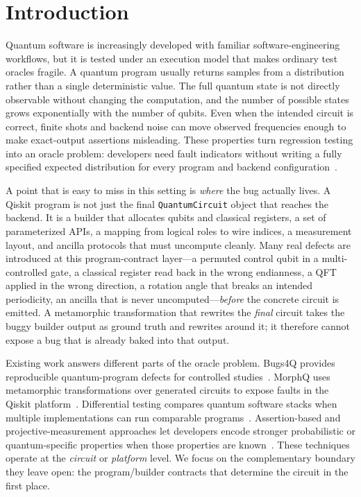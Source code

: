 \section{Introduction}

Quantum software is increasingly developed with familiar software-engineering workflows, but it is tested under an execution model that makes ordinary test oracles fragile. A quantum program usually returns samples from a distribution rather than a single deterministic value. The full quantum state is not directly observable without changing the computation, and the number of possible states grows exponentially with the number of qubits. Even when the intended circuit is correct, finite shots and backend noise can move observed frequencies enough to make exact-output assertions misleading. These properties turn regression testing into an oracle problem: developers need fault indicators without writing a fully specified expected distribution for every program and backend configuration~\cite{preskill2018quantum,huang2019statistical,li2020projection}.

A point that is easy to miss in this setting is \emph{where} the bug actually lives. A Qiskit program is not just the final \texttt{QuantumCircuit} object that reaches the backend. It is a builder that allocates qubits and classical registers, a set of parameterized APIs, a mapping from logical roles to wire indices, a measurement layout, and ancilla protocols that must uncompute cleanly. Many real defects are introduced at this program-contract layer---a permuted control qubit in a multi-controlled gate, a classical register read back in the wrong endianness, a QFT applied in the wrong direction, a rotation angle that breaks an intended periodicity, an ancilla that is never uncomputed---\emph{before} the concrete circuit is emitted. A metamorphic transformation that rewrites the \emph{final} circuit takes the buggy builder output as ground truth and rewrites around it; it therefore cannot expose a bug that is already baked into that output.

Existing work answers different parts of the oracle problem. Bugs4Q provides reproducible quantum-program defects for controlled studies~\cite{miao2023bugs4q}. MorphQ uses metamorphic transformations over generated circuits to expose faults in the Qiskit platform~\cite{paltenghi2023morphq}. Differential testing compares quantum software stacks when multiple implementations can run comparable programs~\cite{wang2021qdiff}. Assertion-based and projective-measurement approaches let developers encode stronger probabilistic or quantum-specific properties when those properties are known~\cite{huang2019statistical,li2020projection,oldfield2025faster}. These techniques operate at the \emph{circuit} or \emph{platform} level. We focus on the complementary boundary they leave open: the program/builder contracts that determine the circuit in the first place.

